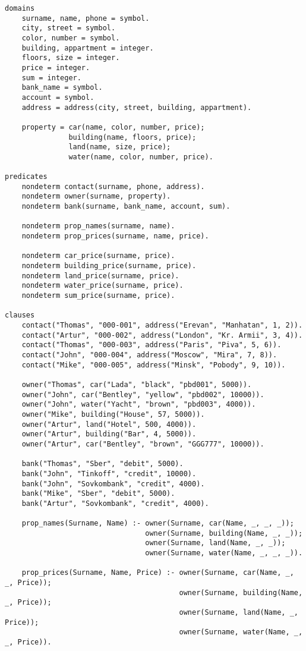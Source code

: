 \begin{lstlisting}
domains
    surname, name, phone = symbol.
    city, street = symbol.
    color, number = symbol.
    building, appartment = integer.
    floors, size = integer.
    price = integer.
    sum = integer.
    bank_name = symbol.
    account = symbol.
    address = address(city, street, building, appartment).

    property = car(name, color, number, price);
               building(name, floors, price);
               land(name, size, price);
               water(name, color, number, price).
 
predicates
    nondeterm contact(surname, phone, address).
    nondeterm owner(surname, property).
    nondeterm bank(surname, bank_name, account, sum).

    nondeterm prop_names(surname, name).
    nondeterm prop_prices(surname, name, price).

    nondeterm car_price(surname, price).
    nondeterm building_price(surname, price).
    nondeterm land_price(surname, price).
    nondeterm water_price(surname, price).
    nondeterm sum_price(surname, price).

clauses
    contact("Thomas", "000-001", address("Erevan", "Manhatan", 1, 2)).
    contact("Artur", "000-002", address("London", "Kr. Armii", 3, 4)).
    contact("Thomas", "000-003", address("Paris", "Piva", 5, 6)).
    contact("John", "000-004", address("Moscow", "Mira", 7, 8)).
    contact("Mike", "000-005", address("Minsk", "Pobody", 9, 10)).
 
    owner("Thomas", car("Lada", "black", "pbd001", 5000)).
    owner("John", car("Bentley", "yellow", "pbd002", 10000)).
    owner("John", water("Yacht", "brown", "pbd003", 4000)).
    owner("Mike", building("House", 57, 5000)).
    owner("Artur", land("Hotel", 500, 4000)).
    owner("Artur", building("Bar", 4, 5000)).
    owner("Artur", car("Bentley", "brown", "GGG777", 10000)).

    bank("Thomas", "Sber", "debit", 5000).
    bank("John", "Tinkoff", "credit", 10000).
    bank("John", "Sovkombank", "credit", 4000).
    bank("Mike", "Sber", "debit", 5000).
    bank("Artur", "Sovkombank", "credit", 4000).
 
    prop_names(Surname, Name) :- owner(Surname, car(Name, _, _, _)); 
    				             owner(Surname, building(Name, _, _)); 
    				             owner(Surname, land(Name, _, _)); 
    				             owner(Surname, water(Name, _, _, _)).
 
    prop_prices(Surname, Name, Price) :- owner(Surname, car(Name, _, _, Price)); 
    				                     owner(Surname, building(Name, _, Price)); 
    				                     owner(Surname, land(Name, _, Price));
    				                     owner(Surname, water(Name, _, _, Price)).
 				  

\end{lstlisting}
